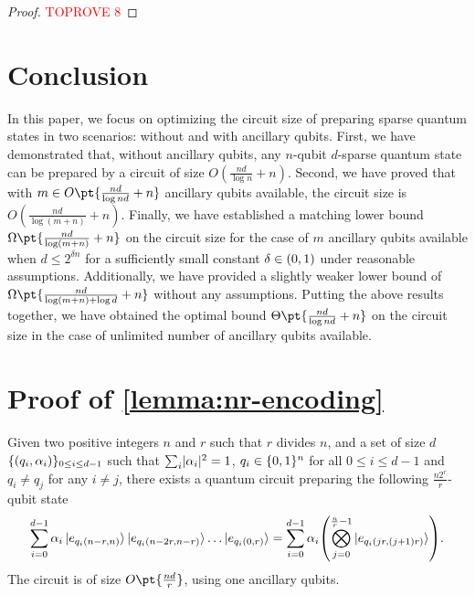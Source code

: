 \documentclass[a4paper,UKenglish,cleveref, autoref, thm-restate]{lipics-v2021}
\DeclarePairedDelimiter\rbra{\lparen}{\rparen}
\DeclarePairedDelimiter\cbra{\{}{\}}
\DeclarePairedDelimiter\abs{\lvert}{\rvert}
\newcommand{\bo}{O\pt}
\newcommand{\om}{\Omega\pt}
\newcommand{\ta}{\Theta\pt}
\begin{document}
\begin{proof}\textcolor{red}{TOPROVE 8}\end{proof}

\section{Conclusion}\label{sec:conclusion}

In this paper, we focus on optimizing the circuit size of preparing sparse quantum states in two scenarios: without  and with ancillary qubits. First, we have demonstrated that, without ancillary qubits, any $n$-qubit $d$-sparse quantum state can be prepared by a circuit of size $O(\frac{nd}{\log n} + n)$. Second,  we have proved that with $m \in \bo{\frac{nd}{\log nd} + n}$ ancillary qubits available, the circuit size is $O(\frac{nd}{\log (m+n)} + n)$. Finally, we have established a matching lower bound  $\om{\frac{nd}{\log(m + n)} + n}$ on the circuit size for the case of $m$ ancillary qubits available when $d \leq 2^{\delta n}$ for a sufficiently small constant $\delta \in \rbra{0, 1}$ under reasonable assumptions. Additionally, we have provided a slightly weaker lower bound of $\om{\frac{nd}{\log(m + n) + \log d} + n}$ without any assumptions. Putting the above results together, we have obtained the optimal bound $\ta{\frac{nd}{\log nd} + n}$ on the circuit size in the case of unlimited  number of ancillary qubits  available.  












\appendix

\section{\texorpdfstring{Proof of \cref{lemma:nr-encoding}}{Proof of Lemma 9 }}\label{app:lemma-nr}

\begin{lemma}
    Given two positive integers $n$ and $r$ such that $r$ divides $n$, and a set of size $d$ $\cbra{(q_i, \alpha_i)}_{0 \leq i \leq d-1}$ such that $\sum_i \abs{\alpha_i}^2 = 1$, $q_i \in \cbra{0, 1}^n$ for all $0 \leq i \leq d-1$ and $q_i \neq q_j$ for any $i \neq j$, there exists a quantum circuit preparing the following $\frac{n2^r}{r}$-qubit state
    \begin{align}
        \sum_{i=0}^{d-1} \alpha_i \ket{e_{q_i(n-r, n)}} \ket{e_{q_i(n-2r, n-r)}} \dots \ket{e_{q_i(0, r)}}
        = \sum_{i=0}^{d-1} \alpha_i \rbra*{\bigotimes_{j=0}^{\frac{n}{r}-1} \ket{e_{q_i(jr, (j+1)r)}}}.
    \end{align}
    The circuit is of size $\bo{\frac{nd}{r}}$, using one ancillary qubits.
\end{lemma}
\end{document}
